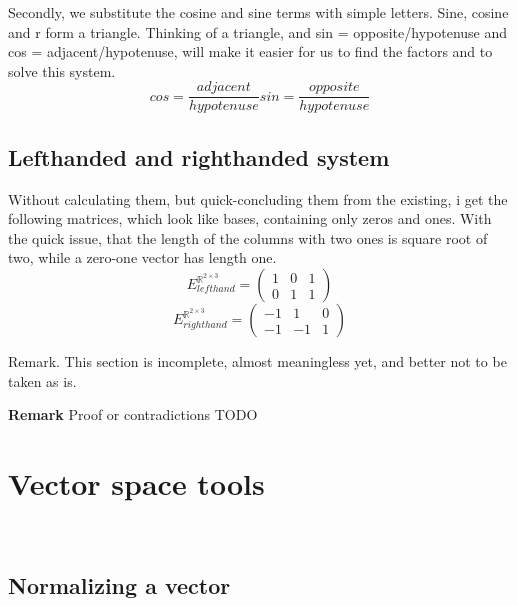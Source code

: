 \documentclass[a4paper]{article}
\begin{document}
Secondly, we substitute the cosine and sine terms with simple letters. Sine, cosine and r form a triangle. Thinking of a triangle, and sin = opposite/hypotenuse and cos = adjacent/hypotenuse, will make it easier for us to find the factors and to solve this system.\\

\begin{displaymath}
    cos = \frac{adjacent}{hypotenuse} 
    sin = \frac{opposite}{hypotenuse}
\end{displaymath}

\subsection{Lefthanded and righthanded system}

Without calculating them, but quick-concluding them from the existing, i get the following matrices, which look like bases, containing only zeros and ones. With the quick issue, that the length of the columns with two ones is square root of two, while a zero-one vector has length one.\\

\begin{displaymath}
    E^{\mathbb{R}^{2\times{3}}}_{lefthand} = \begin{pmatrix}1&0&1\\0&1&1\end{pmatrix}
\end{displaymath}
\begin{displaymath}
    E^{\mathbb{R}^{2\times{3}}}_{righthand} = \begin{pmatrix}-1&1&0\\-1&-1&1\end{pmatrix}
\end{displaymath}

Remark. This section is incomplete, almost meaningless yet, and better not to be taken as is.

\textbf{Remark} Proof or contradictions TODO

\section{Vector space tools}\\




\subsection{Normalizing a vector}
\label{normalizing_a_vector}
\end{document}
